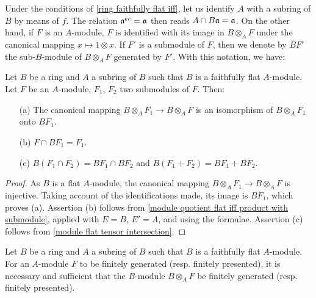 Under the conditions of \cref{ring faithfully flat iff}, let us identify $A$ with a subring of $B$ by means of $f$. The relation $\mathfrak{a}^{ec}=\mathfrak{a}$ then reads $A\cap B\mathfrak{a}=\mathfrak{a}$. On the other hand, if $F$ is an $A$-module, $F$ is identified with its image in $B\otimes_AF$ under the canonical mapping $x\mapsto 1\otimes x$. If $F'$ is a submodule of $F$, then we denote by $BF'$ the sub-$B$-module of $B\otimes_AF$ generated by $F'$. With this notation, we have:
\begin{proposition}\label{module extension to faithfully flat ring submodule prop}
Let $B$ be a ring and $A$ a subring of $B$ such that $B$ is a faithfully flat $A$-module. Let $F$ be an $A$-module, $F_1$, $F_2$ two submodules of $F$. Then:
\begin{itemize}
\item[(a)] The canonical mapping $B\otimes_AF_1\to B\otimes_AF$ is an isomorphism of $B\otimes_AF_1$ onto $BF_1$.
\item[(b)] $F\cap BF_1=F_1$.
\item[(c)] $B(F_1\cap F_2)=BF_1\cap BF_2$ and $B(F_1+F_2)=BF_1+BF_2$. 
\end{itemize}
\end{proposition}
\begin{proof}
As $B$ is a flat $A$-module, the canonical mapping $B\otimes_AF_1\to B\otimes_AF$ is injective. Taking account of the identifications made, its image is $BF_1$, which proves (a). Assertion (b) follows from \cref{module quotient flat iff product with submodule}, applied with $E=B$, $E'=A$, and using the formulae. Assertion (c) follows from \cref{module flat tensor intersection}.
\end{proof}
\begin{proposition}\label{module extension to faithfully flat ring finiteness iff}
Let $B$ be a ring and $A$ a subring of $B$ such that $B$ is a faithfully flat $A$-module. For an $A$-module $F$ to be finitely generated (resp. finitely presented), it is necessary and sufficient that the $B$-module $B\otimes_AF$ be finitely generated (resp. finitely presented).
\end{proposition}
